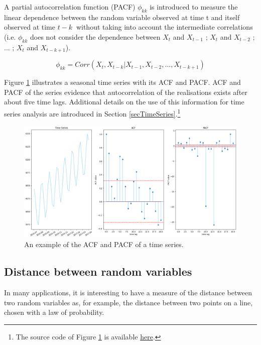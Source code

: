 A partial autocorrelation function (PACF) $\phi_{kk}$ is introduced to measure the linear dependence between the random variable observed at time t and itself observed at time $t-k\ $ without taking into account the intermediate correlations (i.e. $\phi_{kk}$ does not consider the dependence between $X_t$ and $X_{t-1}$ ; $X_t$ and $X_{t-2}$ ; ... ; $X_t$ and $X_{t-k+1}$).

\begin{equation}
\phi_{kk}=Corr(X_t,X_{t-k}|X_{t-1},X_{t-2},\ldots,X_{t-k+1})
\label{eq_PACF}
\end{equation}

Figure \ref{fig_ACFPACF} illustrates a seasonal time series with its ACF and PACF. ACF and PACF of the series evidence that autocorrelation of the realisations exists after about five time lags. Additional details on the use of this information for time series analysis are introduced in Section \ref{secTimeSeries}.\footnote{The source code of Figure \ref{fig_ACFPACF} is available \href{https://github.com/aletuf93/logproj/blob/master/examples/02.\%20Time\%20Series.ipynb}{here}.}

\begin{figure}[hbt!]
\centering
\includegraphics[width=1\textwidth]{SectionLetsMath/elemStat_figures/fig_ACFPACF.png}
\captionsetup{type=figure}
\caption{An example of the ACF and PACF of a time series.}
\label{fig_ACFPACF}
\end{figure}

\subsection{Distance between random variables}
In many applications, it is interesting to have a measure of the distance between two random variables as, for example, the distance between two points on a line, chosen with a law of probability. \par

